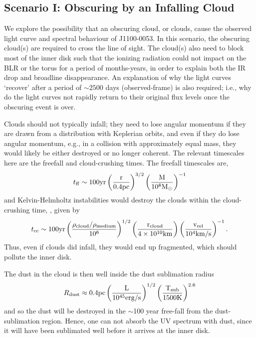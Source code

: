 \documentclass[11pt,a4paper]{article}
\begin{document}
\subsection*{Scenario I: Obscuring by an Infalling Cloud}
We explore the possibility that an obscuring cloud, or clouds, cause
the observed light curve and spectral behaviour of J1100-0053.  In
this scenario, the obscuring cloud(s) are required to cross the line
of sight. The cloud(s) also need to block most of the inner disk such
that the ionizing radiation could not impact on the BLR or the torus
for a period of months-years, in order to explain both the IR drop and
broadline disappearance. An explanation of why the light curves
`recover' after a period of $\sim 2500$ days (observed-frame) is also
required; i.e., why do the light curves not rapidly return to their
original flux levels once the obscuring event is over.

Clouds should not typically infall; they need to lose angular momentum if they are drawn from a distribution with Keplerian orbits, and even if they do lose angular momentum, e.g., in a collision with approximately equal mass, they would likely be either destroyed or no longer coherent. The relevant timescales here are the freefall and cloud-crushing times. The freefall timescales are,
\begin{equation}
    t_{{\rm ff}}   \sim 100   \rm{yr}  \left(\frac{r}{0.4\rm{pc}}\right)^{3/2} 
                                            \left(\frac{M}{10^{8}M_{\odot}}\right)^{-1}
\end{equation}
and Kelvin-Helmholtz instabilities would destroy the clouds within the cloud-crushing time, \citep[e.g., ][]{Nagakura2008, Hopkins2013, Shiokawa2015, Bae2016}, given by
\begin{equation}
    t_{\rm cc} \sim 100\rm{yr} \left(\frac{\rho_{cloud}/\rho_{medium}}{10^{6}}\right)^{1/2} 
                                            \left(\frac{r_{\rm cloud}}{4 \times 10^{10}\rm{km}}\right) 
                                            \left(\frac{v_{\rm rel}}{10^{4}\rm{km/s}}\right)^{-1}.
\end{equation}
Thus, even if clouds did infall, they would end up fragmented, which should pollute the inner disk. 

The dust in the cloud is then well inside the dust sublimation radius
\begin{equation}
    R_{\rm dust} \approx 0.4\rm{pc}\left(\frac{L}{10^{45}\rm{erg/s}}\right)^{1/2}
                                                   \left(\frac{T_{\rm sub}}{1500\rm{K}}\right)^{2.6}
\end{equation}
and so the dust will be destroyed in the $\sim$100 year free-fall from the dust-sublimation region. Hence, one can not absorb the UV spectrum with dust, since it will have been sublimated well before it arrives at the inner disk.
\end{document}
